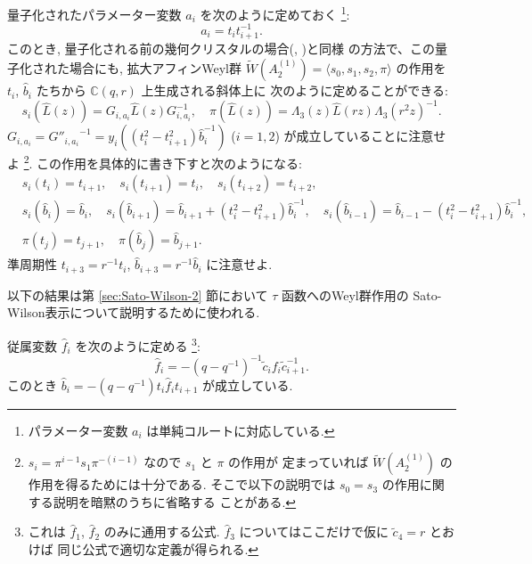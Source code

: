 \documentclass[12pt,twoside,dvipdfm]{msjproc}
\newcommand\C{{\mathbb C}} %
\theoremstyle{definition} %
\theoremstyle{definition} %
\theoremstyle{definition} %
\numberwithin{theorem}{section}
\numberwithin{equation}{section}
\numberwithin{figure}{section}
\numberwithin{table}{section}
\newcommand\secref[1]{第 \ref{#1} 節}
\newcommand\bra{\langle}
\newcommand\ket{\rangle}
\newcommand\WW{\widetilde{W}}
\newcommand\tc{{\tilde{c}}}
\newcommand\hL{{\widehat{L}}}
\newcommand\hb{{\hat{b}}}
\newcommand\hf{{\hat{f}}}
\begin{document}
量子化されたパラメーター変数 $a_i$ を次のように定めておく%
\footnote{パラメーター変数 $a_i$ は単純コルートに対応している.}:
\begin{equation*}
  a_i = t_i t_{i+1}^{-1}.
\end{equation*}
このとき, 量子化される前の幾何クリスタルの場合(\cite{BK-GC1}, \cite{BK-GC2})と同様
の方法で、この量子化された場合にも, 
拡大アフィンWeyl群 $\WW(A^{(1)}_2)=\bra s_0,s_1,s_2,\pi\ket$
の作用を $t_i$, $\hb_i$ たちから $\C(q,r)$ 上生成される斜体上に
次のように定めることができる:
\begin{equation*}
 s_i(\hL(z)) = G_{i,a_i} \hL(z) G_{i,a_i}^{-1}, \quad
 \pi(\hL(z)) = \Lambda_3(z) \hL(rz) \Lambda_3(r^2z)^{-1}.
\end{equation*}
$G_{i,a_i} = {G''_{i,a_i}}^{-1} = y_i((t_i^2-t_{i+1}^2)\hb_i^{-1})$ 
($i=1,2$) が成立していることに注意せよ%
\footnote{$s_i = \pi^{i-1}s_1\pi^{-(i-1)}$ なので $s_1$ と $\pi$ の作用が
定まっていれば $\WW(A^{(1)}_2)$ の作用を得るためには十分である.
そこで以下の説明では $s_0=s_3$ の作用に関する説明を暗黙のうちに省略する
ことがある.}.
この作用を具体的に書き下すと次のようになる:
\begin{align*}
 &
 s_i(t_i) = t_{i+1}, \quad
 s_i(t_{i+1}) = t_i, \quad
 s_i(t_{i+2}) = t_{i+2},
 \\ &
 s_i(\hb_i) = \hb_i, \quad
 s_i(\hb_{i+1}) = \hb_{i+1} + (t_i^2-t_{i+1}^2)\hb_i^{-1}, \quad
 s_i(\hb_{i-1}) = \hb_{i-1} - (t_i^2-t_{i+1}^2)\hb_i^{-1},
 \\ &
 \pi(t_j) = t_{j+1}, \quad
 \pi(\hb_j) = \hb_{j+1}.
\end{align*}
準周期性 $t_{i+3}=r^{-1}t_i$, $\hb_{i+3}=r^{-1}\hb_i$ に注意せよ.


以下の結果は\secref{sec:Sato-Wilson-2}において $\tau$ 函数へのWeyl群作用の
Sato-Wilson表示について説明するために使われる.

従属変数 $\hf_i$ を次のように定める
\footnote{これは $\hf_1$, $\hf_2$ のみに通用する公式.
$\hf_3$ についてはここだけで仮に $\tc_4=r$ とおけば
同じ公式で適切な定義が得られる.}:
\begin{equation*} 
 \hf_i = -(q-q^{-1})^{-1}\tc_i f_i \tc_{i+1}^{-1}.
\end{equation*}
このとき $\hb_i = -(q-q^{-1})t_i \hf_i t_{i+1}$ が成立している.
\end{document}
